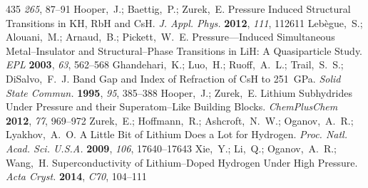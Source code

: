 \documentclass[12pt,letterpaper,oneside]{article}
\begin{document}
\begin{mcitethebibliography}{435}
  \emph{265}, 87--91\relax
\mciteBstWouldAddEndPuncttrue
\mciteSetBstMidEndSepPunct{\mcitedefaultmidpunct}
{\mcitedefaultendpunct}{\mcitedefaultseppunct}\relax
\EndOfBibitem
{}
Hooper,~J.; Baettig,~P.; Zurek,~E. Pressure Induced Structural Transitions in
  KH, RbH and CsH. \emph{J. Appl. Phys.} \textbf{2012}, \emph{111},
  112611\relax
\mciteBstWouldAddEndPuncttrue
\mciteSetBstMidEndSepPunct{\mcitedefaultmidpunct}
{\mcitedefaultendpunct}{\mcitedefaultseppunct}\relax
\EndOfBibitem
{}
Leb{\`e}gue,~S.; Alouani,~M.; Arnaud,~B.; Pickett,~W.~E. Pressure---Induced
  Simultaneous Metal--Insulator and Structural--Phase Transitions in LiH: A
  Quasiparticle Study. \emph{EPL} \textbf{2003}, \emph{63}, 562--568\relax
\mciteBstWouldAddEndPuncttrue
\mciteSetBstMidEndSepPunct{\mcitedefaultmidpunct}
{\mcitedefaultendpunct}{\mcitedefaultseppunct}\relax
\EndOfBibitem
{}
Ghandehari,~K.; Luo,~H.; Ruoff,~A.~L.; Trail,~S.~S.; DiSalvo,~F.~J. Band Gap
  and Index of Refraction of CsH to 251~GPa. \emph{Solid State Commun.}
  \textbf{1995}, \emph{95}, 385--388\relax
\mciteBstWouldAddEndPuncttrue
\mciteSetBstMidEndSepPunct{\mcitedefaultmidpunct}
{\mcitedefaultendpunct}{\mcitedefaultseppunct}\relax
\EndOfBibitem
{}
Hooper,~J.; Zurek,~E. Lithium Subhydrides Under Pressure and their
  Superatom--Like Building Blocks. \emph{ChemPlusChem} \textbf{2012},
  \emph{77}, 969--972\relax
\mciteBstWouldAddEndPuncttrue
\mciteSetBstMidEndSepPunct{\mcitedefaultmidpunct}
{\mcitedefaultendpunct}{\mcitedefaultseppunct}\relax
\EndOfBibitem
{}
Zurek,~E.; Hoffmann,~R.; Ashcroft,~N.~W.; Oganov,~A.~R.; Lyakhov,~A.~O. A
  Little Bit of Lithium Does a Lot for Hydrogen. \emph{Proc. Natl. Acad. Sci.
  U.S.A.} \textbf{2009}, \emph{106}, 17640--17643\relax
\mciteBstWouldAddEndPuncttrue
\mciteSetBstMidEndSepPunct{\mcitedefaultmidpunct}
{\mcitedefaultendpunct}{\mcitedefaultseppunct}\relax
\EndOfBibitem
{}
Xie,~Y.; Li,~Q.; Oganov,~A.~R.; Wang,~H. Superconductivity of Lithium--Doped
  Hydrogen Under High Pressure. \emph{Acta Cryst.} \textbf{2014}, \emph{C70},
  104--111\relax
\mciteBstWouldAddEndPuncttrue
\mciteSetBstMidEndSepPunct{\mcitedefaultmidpunct}

\end{mcitethebibliography}
\end{document}
